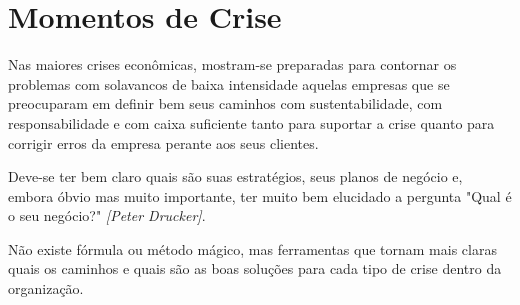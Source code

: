 \documentclass[12pt,a4paper]{article}
\begin{document}
\section{Momentos de Crise}

Nas maiores crises econômicas, mostram-se preparadas para contornar os problemas com solavancos de baixa intensidade aquelas empresas que se preocuparam em definir bem seus caminhos com sustentabilidade, com responsabilidade e com caixa suficiente tanto para suportar a crise quanto para corrigir erros da empresa perante aos seus clientes.

Deve-se ter bem claro quais são suas estratégios, seus planos de negócio e, embora óbvio mas muito importante, ter muito bem elucidado a pergunta "Qual é o seu negócio?" \textit{[Peter Drucker]}.

Não existe fórmula ou método mágico, mas ferramentas que tornam mais claras quais os caminhos e quais são as boas soluções para cada tipo de crise dentro da organização.
\end{document}
